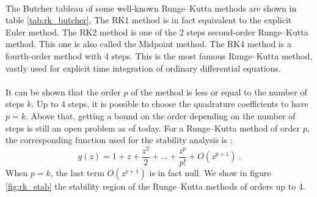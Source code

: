         \paragraph{}
        The Butcher tableau of some well-known Runge--Kutta methods are shown in table \ref{tab:rk_butcher}.
        The RK1 method is in fact equivalent to the explicit Euler method.
        The RK2 method is one of the 2 steps second-order Runge--Kutta method.
        This one is also called the Midpoint method.
        The RK4 method is a fourth-order method with 4 steps.
        This is the most famous Runge--Kutta method, vastly used for explicit time integration of ordinary differential equations.

        \paragraph{}
        It can be shown that the order $p$ of the method is less or equal to the number of steps $k$.
        Up to 4 steps, it is possible to choose the quadrature coefficients to have $p = k$.
        Above that, getting a bound on the order depending on the number of steps is still an open problem as of today.
        For a Runge--Kutta method of order $p$, the corresponding function used for the stability analysis is \cite{HairerWanner1996}:
        \begin{equation}
          g\left(z\right) = 1 + z + \frac{z^2}{2} + \dots + \frac{z^p}{p!} + O\left(z^{p+1}\right) \ .
        \end{equation}
        When $p = k$, the last term $O\left(z^{p+1}\right)$ is in fact null.
        We show in figure \ref{fig:rk_stab} the stability region of the Runge--Kutta methods of orders up to 4.


